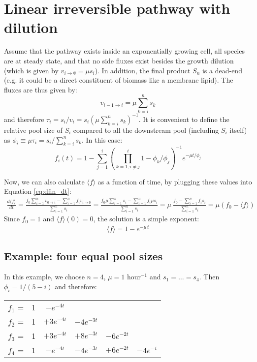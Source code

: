 \documentclass{article}
\newcommand{\fin}{\ensuremath{\langle f \rangle}}
\newcommand{\flux}[2]{\ensuremath{v_{{#1} \rightarrow {#2}}}}
\begin{document}
\section{Linear irreversible pathway with dilution}\label{sec:linear_examples}
Assume that the pathway exists inside an exponentially growing cell, all species are at steady state, and that no side fluxes exist besides the growth dilution (which is given by $\flux{i}{\emptyset} = \mu s_i$). In addition, the final product $S_n$ is a dead-end (e.g. it could be a direct constituent of biomass like a membrane lipid). The fluxes are thus given by:
\begin{equation}
    \flux{i-1}{i} = \mu \sum_{k=i}^n s_k
\end{equation}
and therefore $\tau_i = s_i/v_i = s_i (\mu \sum_{k=i}^n s_k)^{-1}$. It is convenient to define the relative pool size of $S_i$ compared to all the downstream pool (including $S_i$ itself) as $\phi_i \equiv \mu\tau_i = s_i / \sum_{k=i}^n s_k$. In this case:
\begin{equation}\label{eq:dilution}
    f_i(t) = 1 - \sum_{j=1}^{i} \left(\prod_{k = 1, i \neq j}^{i} 1 - \phi_k/\phi_j\right)^{-1} e^{- \mu t / \phi_j}
\end{equation}

Now, we can also calculate $\fin$ as a function of time, by plugging these values into Equation \ref{eq:dfin_dt}:
\begin{eqnarray}
	\frac{d\fin}{dt} = \frac{f_0 \sum_{i=1}^{n} \flux{0}{i} - \sum_{i=1}^{n} f_i \flux{i}{\emptyset}}{\sum_{i=1}^{n} s_i}
	= \frac{f_0 \mu \sum_{i=1}^{n} s_i - \sum_{i=1}^{n} f_i \mu s_i }{\sum_{i=1}^{n} s_i} 
	= \mu~\frac{f_0 - \sum_{i=1}^{n} f_i s_i }{\sum_{i=1}^{n} s_i} = \mu \left(f_0 - \fin\right)
\end{eqnarray}
Since $f_0 = 1$ and $\fin(0) = 0$, the solution is a simple exponent:
\begin{eqnarray}
	\fin = 1 - e^{-\mu\,t} \label{eq:fin_dilution}
\end{eqnarray}


\subsection{Example: four equal pool sizes}
In this example, we choose $n = 4$, $\mu = 1$ hour$^{-1}$ and $s_1 = \ldots = s_4$. Then $\phi_i = 1/(5-i)$ and therefore:
\begin{center}
\begin{tabular}{cccccc}
    $f_1$ = & 1 & $- e^{-4t}$ &&&\\
    $f_2$ = & 1 & $+ 3 e^{-4t}$ & $- 4 e^{-3t}$ &&\\
    $f_3$ = & 1 & $+ 3 e^{-4t}$ & $+ 8 e^{-3t}$ & $- 6 e^{-2t}$ &\\
    $f_4$ = & 1 & $- e^{-4t}$   & $- 4 e^{-3t}$ & $+ 6 e^{-2t}$ & $- 4 e^{-t}$
\end{tabular}
\end{center}
\end{document}
